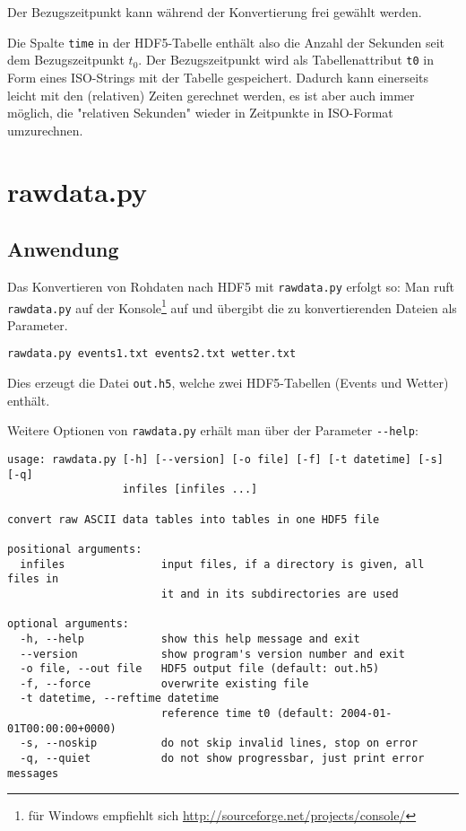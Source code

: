 \documentclass[version=last,
	a4paper,			%
	pagesize, 			%
	11pt,				%
	BCOR1cm,			%
	DIV12,	 			%
	pointlessnumbers,   %
	halfparskip,		%
]{scrreprt}
\begin{document}
Der Bezugszeitpunkt kann während der Konvertierung frei gewählt werden.

Die Spalte \texttt{time} in der HDF5-Tabelle enthält also  die Anzahl der Sekunden seit dem Bezugszeitpunkt $t_0$. Der Bezugszeitpunkt wird als Tabellenattribut \texttt{t0} in Form eines ISO-Strings mit der Tabelle gespeichert. Dadurch kann einerseits leicht mit den (relativen) Zeiten gerechnet werden, es ist aber auch immer möglich, die "relativen Sekunden" wieder in Zeitpunkte in ISO-Format umzurechnen.

\section{rawdata.py}
\subsection{Anwendung}
Das Konvertieren von Rohdaten nach HDF5 mit \texttt{rawdata.py} erfolgt so: Man ruft \texttt{rawdata.py} auf der Konsole\footnote{für Windows empfiehlt sich \url{http://sourceforge.net/projects/console/}} auf und übergibt die zu konvertierenden Dateien als Parameter.
\begin{lstlisting}
rawdata.py events1.txt events2.txt wetter.txt
\end{lstlisting}
Dies erzeugt die Datei \texttt{out.h5}, welche zwei HDF5-Tabellen (Events und Wetter) enthält.

Weitere Optionen von \texttt{rawdata.py} erhält man über der Parameter \verb"--help":
\begin{lstlisting}[caption={Kommandozeilen-Hilfe von rawdata.py}]
usage: rawdata.py [-h] [--version] [-o file] [-f] [-t datetime] [-s] [-q]
                  infiles [infiles ...]

convert raw ASCII data tables into tables in one HDF5 file

positional arguments:
  infiles               input files, if a directory is given, all files in
                        it and in its subdirectories are used

optional arguments:
  -h, --help            show this help message and exit
  --version             show program's version number and exit
  -o file, --out file   HDF5 output file (default: out.h5)
  -f, --force           overwrite existing file
  -t datetime, --reftime datetime
                        reference time t0 (default: 2004-01-01T00:00:00+0000)
  -s, --noskip          do not skip invalid lines, stop on error
  -q, --quiet           do not show progressbar, just print error messages
\end{lstlisting}
\end{document}
